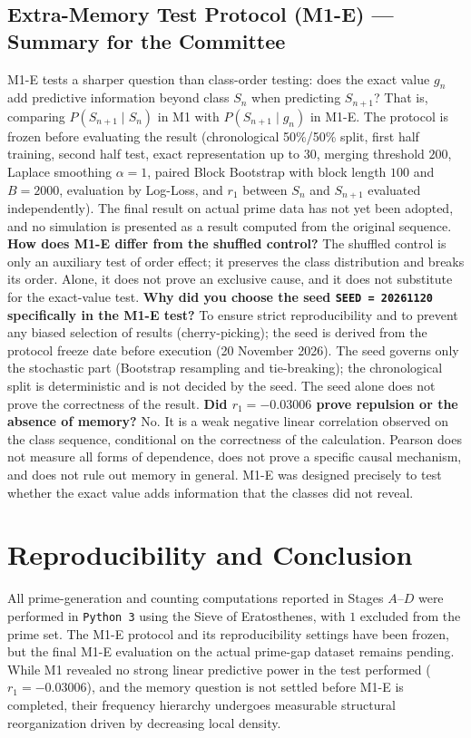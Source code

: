 \documentclass[12pt,a4paper]{article}
\begin{document}
\subsection*{Extra-Memory Test Protocol (M1-E) --- Summary for the Committee}
M1-E tests a sharper question than class-order testing: does the exact value $g_n$ add predictive information beyond class $S_n$ when predicting $S_{n+1}$? That is, comparing $P(S_{n+1}\mid S_n)$ in M1 with $P(S_{n+1}\mid g_n)$ in M1-E. The protocol is frozen before evaluating the result (chronological 50\%/50\% split, first half training, second half test, exact representation up to $30$, merging threshold $200$, Laplace smoothing $\alpha=1$, paired Block Bootstrap with block length $100$ and $B=2000$, evaluation by Log-Loss, and $r_1$ between $S_n$ and $S_{n+1}$ evaluated independently). The final result on actual prime data has not yet been adopted, and no simulation is presented as a result computed from the original sequence.
\textbf{How does M1-E differ from the shuffled control?} The shuffled control is only an auxiliary test of order effect; it preserves the class distribution and breaks its order. Alone, it does not prove an exclusive cause, and it does not substitute for the exact-value test.
\textbf{Why did you choose the seed \texttt{SEED = 20261120} specifically in the M1-E test?} To ensure strict reproducibility and to prevent any biased selection of results (cherry-picking); the seed is derived from the protocol freeze date before execution (20 November 2026). The seed governs only the stochastic part (Bootstrap resampling and tie-breaking); the chronological split is deterministic and is not decided by the seed. The seed alone does not prove the correctness of the result.
\textbf{Did $r_1=-0.03006$ prove repulsion or the absence of memory?} No. It is a weak negative linear correlation observed on the class sequence, conditional on the correctness of the calculation. Pearson does not measure all forms of dependence, does not prove a specific causal mechanism, and does not rule out memory in general. M1-E was designed precisely to test whether the exact value adds information that the classes did not reveal.
\section{Reproducibility and Conclusion}
All prime-generation and counting computations reported in Stages $A$--$D$ were performed in \texttt{Python 3} using the Sieve of Eratosthenes, with $1$ excluded from the prime set. The M1-E protocol and its reproducibility settings have been frozen, but the final M1-E evaluation on the actual prime-gap dataset remains pending. While M1 revealed no strong linear predictive power in the test performed ($r_1 = -0.03006$), and the memory question is not settled before M1-E is completed, their frequency hierarchy undergoes measurable structural reorganization driven by decreasing local density.
\end{document}
